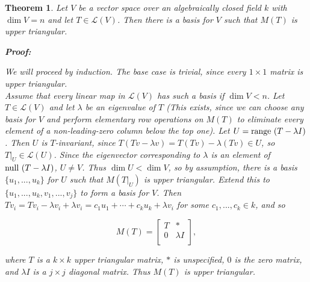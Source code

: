 \documentclass{article}
\theoremstyle{colontheorem}
\newtheorem{theorem}{Theorem}[section]
\newcommand{\Null}{\textnormal{null }}
\newcommand{\Range}{\textnormal{range }}
\newenvironment{Theorem}
{
	\begin{mdframed}[backgroundcolor=TheoremOrange!10]
	\begin{theorem}
}
{
	\end{theorem}
	\end{mdframed}
	
	\vspace{.15in}
}
\newenvironment{Proof}
{
	\begin{mdframed}[backgroundcolor=ProofPurple!10]
	\textbf{Proof:}%
}
{
	\end{mdframed}
	
	\vspace{.085in}
}
\begin{document}
\begin{Theorem}
	
	Let $V$ be a vector space over an algebraically closed field $k$ with $\dim V = n$ and let $T \in \mathcal{L}(V)$. Then there is a basis for $V$ such that $M(T)$ is upper triangular.
	
	\begin{Proof}
		We will proceed by induction. The base case is trivial, since every $1 \times 1$ matrix is upper triangular.\\
		
		Assume that every linear map in $\mathcal{L}(V)$ has such a basis if $\dim V < n$. Let $T \in \mathcal{L}(V)$ and let $\lambda$ be an eigenvalue of $T$ (This exists, since we can choose any basis for $V$ and perform elementary row operations on $M(T)$ to eliminate every element of a non-leading-zero column below the top one). Let $U = \Range (T - \lambda I)$. Then $U$ is $T$-invariant, since $T(Tv - \lambda v) = T(Tv) - \lambda (Tv) \in U$, so $T|_U \in \mathcal{L}(U)$. Since the eigenvector corresponding to $\lambda$ is an element of $\Null (T - \lambda I)$, $U \neq V$. Thus $\dim U < \dim V$, so by assumption, there is a basis $\{u_1, ..., u_k\}$ for $U$ such that $M(T|_U)$ is upper triangular. Extend this to $\{u_1, ..., u_k, v_1, ..., v_j\}$ to form a basis for $V$. Then $Tv_i = Tv_i - \lambda v_i + \lambda v_i = c_1 u_1 + \cdots + c_k u_k + \lambda v_i$ for some $c_1, ..., c_k \in k$, and so
		
		$$
			M(T) = \begin{bmatrix}
				T & *\\
				0 & \lambda I\\
			\end{bmatrix},
		$$
		
		where $T$ is a $k \times k$ upper triangular matrix, $*$ is unspecified, $0$ is the zero matrix, and $\lambda I$ is a $j \times j$ diagonal matrix. Thus $M(T)$ is upper triangular.
		
	\end{Proof}
	
\end{Theorem}
\end{document}
